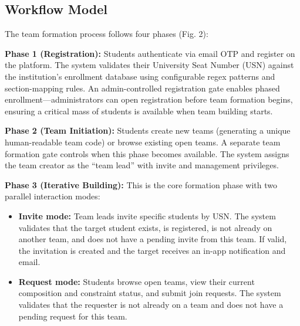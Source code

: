 \documentclass[12pt,a4paper]{article}
\begin{document}
\subsection{Workflow Model}

The team formation process follows four phases (Fig. 2):

\begin{figure}[H]
\centering
{}
\end{figure}

\textbf{Phase 1 (Registration):} Students authenticate via email OTP and register on the platform. The system validates their University Seat Number (USN) against the institution's enrollment database using configurable regex patterns and section-mapping rules. An admin-controlled registration gate enables phased enrollment---administrators can open registration before team formation begins, ensuring a critical mass of students is available when team building starts.

\textbf{Phase 2 (Team Initiation):} Students create new teams (generating a unique human-readable team code) or browse existing open teams. A separate team formation gate controls when this phase becomes available. The system assigns the team creator as the ``team lead'' with invite and management privileges.

\textbf{Phase 3 (Iterative Building):} This is the core formation phase with two parallel interaction modes:

\begin{itemize}[noitemsep,topsep=3pt]
    \item \textbf{Invite mode:} Team leads invite specific students by USN. The system validates that the target student exists, is registered, is not already on another team, and does not have a pending invite from this team. If valid, the invitation is created and the target receives an in-app notification and email.
    \item \textbf{Request mode:} Students browse open teams, view their current composition and constraint status, and submit join requests. The system validates that the requester is not already on a team and does not have a pending request for this team.
\end{itemize}
\end{document}
